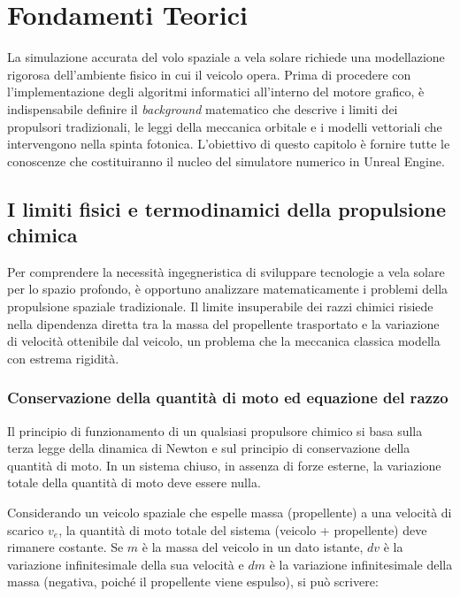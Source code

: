 \chapter{Fondamenti Teorici}
\label{chap:fondamenti_teorici}

La simulazione accurata del volo spaziale a vela solare richiede una modellazione rigorosa dell'ambiente fisico in cui il veicolo opera. Prima di procedere con l'implementazione degli algoritmi informatici all'interno del motore grafico, è indispensabile definire il \textit{background} matematico che descrive i limiti dei propulsori tradizionali, le leggi della meccanica orbitale e i modelli vettoriali che intervengono nella spinta fotonica. L'obiettivo di questo capitolo è fornire tutte le conoscenze che costituiranno il nucleo del simulatore numerico in Unreal Engine.


\section{I limiti fisici e termodinamici della propulsione chimica}
Per comprendere la necessità ingegneristica di sviluppare tecnologie a vela solare per lo spazio profondo, è opportuno analizzare matematicamente i problemi della propulsione spaziale tradizionale. Il limite insuperabile dei razzi chimici risiede nella dipendenza diretta tra la massa del propellente trasportato e la variazione di velocità ottenibile dal veicolo, un problema che la meccanica classica modella con estrema rigidità.


\subsection{Conservazione della quantità di moto ed equazione del razzo}
Il principio di funzionamento di un qualsiasi propulsore chimico si basa sulla terza legge della dinamica di Newton e sul principio di conservazione della quantità di moto. In un sistema chiuso, in assenza di forze esterne, la variazione totale della quantità di moto deve essere nulla.

Considerando un veicolo spaziale che espelle massa (propellente) a una velocità di scarico $v_e$, la quantità di moto totale del sistema (veicolo + propellente) deve rimanere costante. Se $m$ è la massa del veicolo in un dato istante, $dv$ è la variazione infinitesimale della sua velocità e $dm$ è la variazione infinitesimale della massa (negativa, poiché il propellente viene espulso), si può scrivere:

